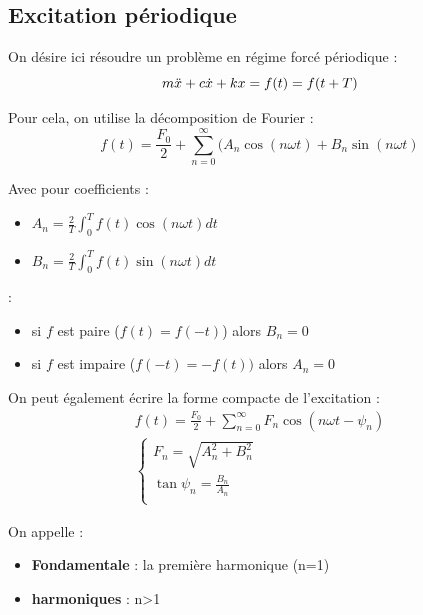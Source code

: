 \documentclass[../main.tex]{subfiles}
\begin{document}
\subsection{Excitation périodique}
On désire ici résoudre un problème en régime forcé périodique : \begin{equation}
    m \Ddot{x} + c\dot{x} + kx = f(t) = f(t+T)
\end{equation}

Pour cela, on utilise la décomposition de Fourier : \begin{equation}
    f(t) = \frac{F_0}{2} + \sum_{n=0}^\infty (A_n \cos(n\omega t) + B_n \sin(n\omega t)
\end{equation}

Avec pour coefficients : \begin{itemize}
    \item $A_n = \frac{2}{T} \int_0^T f(t) \cos(n\omega t)dt$\\
    \item $B_n = \frac{2}{T} \int_0^T f(t) \sin(n\omega t)dt$\\
\end{itemize}

\warning : \begin{itemize}
    \item si $f$ est paire ($f(t) = f(-t)$) alors $B_n=0$\\
    \item si $f$ est impaire ($f(-t) = -f(t))$ alors $A_n = 0$\\
\end{itemize}

On peut également écrire la forme compacte de l'excitation : \begin{equation}\begin{gathered}
    f(t) = \frac{F_0}{2} + \sum_{n=0}^\infty F_n \cos(n\omega t- \psi_n)\\
    \begin{cases}
        F_n = \sqrt{A_n^2+B_n^2}\\
        \tan \psi_n = \frac{B_n}{A_n}\\
    \end{cases}
    \end{gathered}
\end{equation}

On appelle : \begin{itemize}
    \item \textbf{Fondamentale} : la première harmonique (n=1)\\
    \item \textbf{harmoniques} : n>1\\
\end{itemize}
\end{document}
